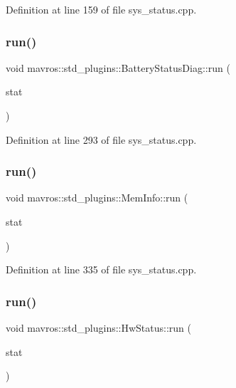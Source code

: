 Definition at line 159 of file sys\+\_\+status.\+cpp.

\mbox{\label{group__plugin_ga7db23723842e4a269592a178d8ab06ef}} 
\subsubsection{\texorpdfstring{run()}{run()}\hspace{0.1cm}{\footnotesize\ttfamily [4/6]}}
{\footnotesize\ttfamily void mavros\+::std\+\_\+plugins\+::\+Battery\+Status\+Diag\+::run (\begin{DoxyParamCaption}\item[{diagnostic\+\_\+updater\+::\+Diagnostic\+Status\+Wrapper \&}]{stat }\end{DoxyParamCaption})\hspace{0.3cm}{\ttfamily [inline]}}



Definition at line 293 of file sys\+\_\+status.\+cpp.

\mbox{\label{group__plugin_gaa1dfbb09b0fa4ddd991b8e4ec012767c}} 
\subsubsection{\texorpdfstring{run()}{run()}\hspace{0.1cm}{\footnotesize\ttfamily [5/6]}}
{\footnotesize\ttfamily void mavros\+::std\+\_\+plugins\+::\+Mem\+Info\+::run (\begin{DoxyParamCaption}\item[{diagnostic\+\_\+updater\+::\+Diagnostic\+Status\+Wrapper \&}]{stat }\end{DoxyParamCaption})\hspace{0.3cm}{\ttfamily [inline]}}



Definition at line 335 of file sys\+\_\+status.\+cpp.

\mbox{\label{group__plugin_gaa8ece83db94ffbadf4bcf7a5e5e501a4}} 
\subsubsection{\texorpdfstring{run()}{run()}\hspace{0.1cm}{\footnotesize\ttfamily [6/6]}}
{\footnotesize\ttfamily void mavros\+::std\+\_\+plugins\+::\+Hw\+Status\+::run (\begin{DoxyParamCaption}\item[{diagnostic\+\_\+updater\+::\+Diagnostic\+Status\+Wrapper \&}]{stat }\end{DoxyParamCaption})\hspace{0.3cm}{\ttfamily [inline]}}



